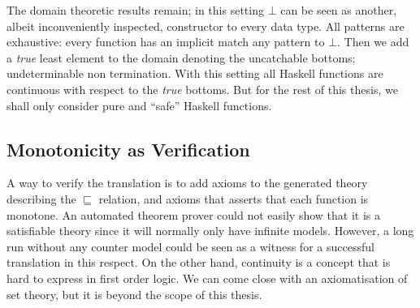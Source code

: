 The domain theoretic results remain; in this setting $\bot$ can be
seen as another, albeit inconveniently inspected, constructor to every
data type. All patterns are exhaustive: every function has an implicit
match any pattern to $\bot$.  Then we add a \emph{true} least element
to the domain denoting the uncatchable bottoms; undeterminable non
termination. With this setting all Haskell functions are continuous
with respect to the \emph{true} bottoms. But for the rest of this
thesis, we shall only consider pure and ``safe'' Haskell functions.

\subsection{Monotonicity as Verification}

A way to verify the translation is to add axioms to the generated
theory describing the $\sqsubseteq$ relation, and axioms that asserts
that each function is monotone. An automated theorem prover could not
easily show that it is a satisfiable theory since it will normally
only have infinite models. However, a long run without any counter
model could be seen as a witness for a successful translation in this
respect.  On the other hand, continuity is a concept that is hard to
express in first order logic. We can come close with an axiomatisation
of set theory, but it is beyond the scope of this thesis.
